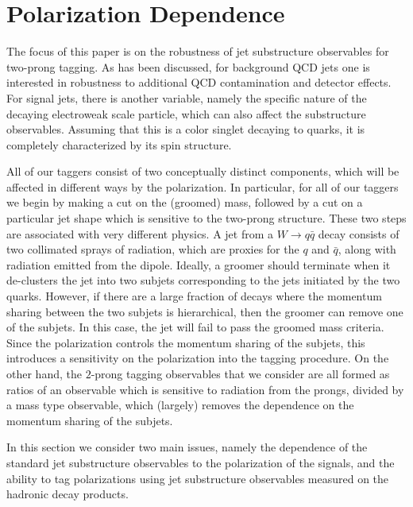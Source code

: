 \documentclass[11pt,letterpaper]{article}
\begin{document}
\section{Polarization Dependence}\label{sec:polar}




The focus of this paper is on the robustness of jet substructure
observables for two-prong tagging.
%
As has been discussed, for
background QCD jets one is interested in robustness to additional QCD
contamination and detector effects. For signal jets, there is another variable, namely the specific nature of the decaying electroweak scale particle, which can also affect the substructure observables.
%
Assuming
that this is a color singlet decaying to quarks, it is completely
characterized by its spin structure.
%








All of our taggers consist of two conceptually distinct components, which will be affected in different ways by the polarization.
%
In particular, for all of our taggers we begin by making a cut on the (groomed) mass, followed by a cut on a particular jet shape which is sensitive to the two-prong structure. These two steps are associated with very different physics. A jet from a $W\to q\bar q$ decay consists of two collimated sprays of radiation, which are proxies for the $q$ and $\bar q$, along with radiation emitted from the dipole.
%
Ideally, a groomer should terminate when it de-clusters the jet into two subjets corresponding to the jets initiated by the two quarks.
%
However, if there are a large fraction of decays where the momentum sharing between the two subjets is hierarchical, then the groomer can remove one of the subjets.
%
In this case, the jet will fail to pass the groomed mass criteria.
%
Since the polarization controls the momentum sharing of the subjets, this introduces a sensitivity on the polarization into the tagging procedure.
%
On the other hand, the $2$-prong tagging observables that we consider are all formed as ratios of an observable which is sensitive to radiation from the prongs, divided by a mass type observable, which (largely) removes the dependence on the momentum sharing of the subjets.


In this section we consider two main issues, namely
the dependence of the standard jet substructure observables to the
polarization of the signals, and the ability to tag polarizations
using jet substructure observables measured on the hadronic decay
products.
\end{document}
